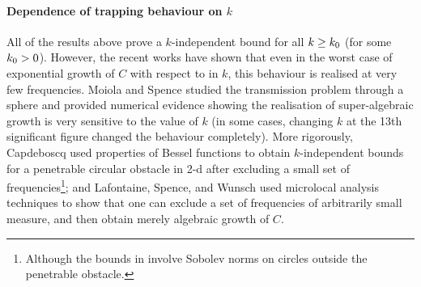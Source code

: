 \paragraph{Dependence of trapping behaviour on $k$} All of the results above prove a $k$-independent bound for all $k \geq k_{0}$ (for some $k_{0} > 0$). However, the recent works \cite{Ca:12,MoSp:19,LaSpWu:19} have shown that even in the worst case of exponential growth of $C$ with respect to in $k$, this behaviour is realised at very few frequencies. Moiola and Spence \cite{MoSp:19} studied the transmission problem through a sphere and provided numerical evidence showing the realisation of super-algebraic growth is very sensitive to the value of $k$ (in some cases, changing $k$ at the 13th significant figure changed the behaviour completely). More rigorously, Capdeboscq \cite{Ca:12} used properties of Bessel functions to obtain $k$-independent bounds for a penetrable circular obstacle in 2-d after excluding a small set of frequencies\footnote{Although the bounds in \cite{Cap:12} involve Sobolev norms on circles outside the penetrable obstacle.}; and Lafontaine, Spence, and Wunsch \cite{LaSpWu:19} used microlocal analysis techniques to show that one can exclude a set of frequencies of arbitrarily small measure, and then obtain merely algebraic growth of $C$.

